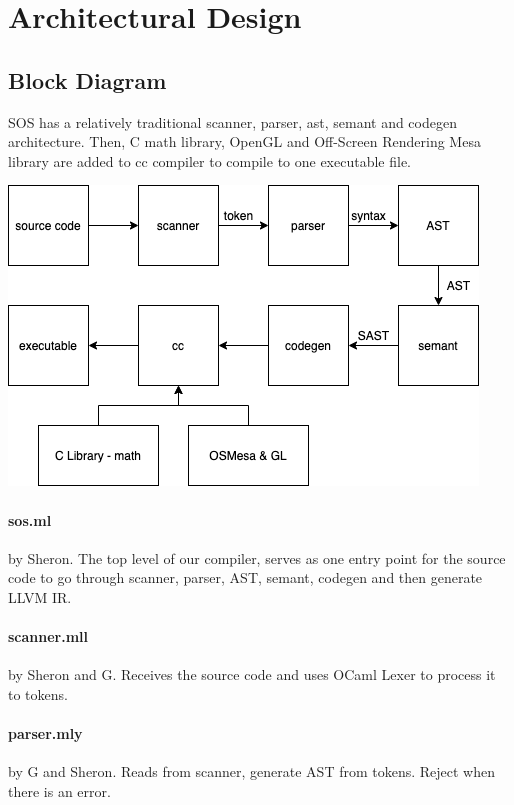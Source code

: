 \documentclass[main.tex]{subfiles}
\begin{document}
	\section{Architectural Design}
	
	\subsection{Block Diagram}
	
	SOS has a relatively traditional scanner, parser, ast, semant and codegen architecture. Then, C math library, OpenGL and Off-Screen Rendering Mesa library are added to cc compiler to compile to one executable file.
	
	\includegraphics[width=\textwidth]{compiler_arch.png}
	
	\paragraph{sos.ml} by Sheron. The top level of our compiler, serves as one entry point for the source code to go through scanner, parser, AST, semant, codegen and then generate LLVM IR.
	
	\paragraph{scanner.mll} by Sheron and G. Receives the source code and uses OCaml Lexer to process it to tokens.
	
	\paragraph{parser.mly} by G and Sheron. Reads from scanner, generate AST from tokens. Reject when there is an error.
	
\end{document}
